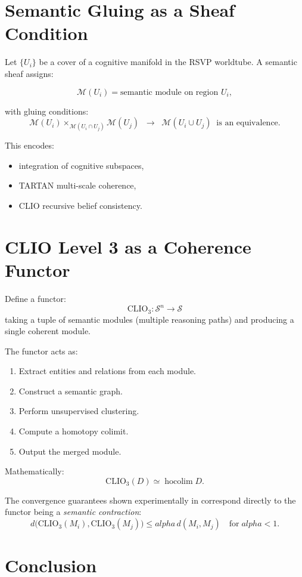 \documentclass[12pt,oneside]{book}
\theoremstyle{plain}
\theoremstyle{definition}
\def\alpha{alpha}%
\begin{document}
\section{Semantic Gluing as a Sheaf Condition}

Let $\{U_i\}$ be a cover of a cognitive manifold in the RSVP worldtube.  
A semantic sheaf assigns:

\[
\mathscr{M}(U_i) = \text{semantic module on region $U_i$},
\]

with gluing conditions:
\[
\mathscr{M}(U_i) \times_{\mathscr{M}(U_i \cap U_j)} \mathscr{M}(U_j)
\;\;\to\;\;
\mathscr{M}(U_i \cup U_j)
\;\;\text{is an equivalence}.
\]

This encodes:
\begin{itemize}
  \item integration of cognitive subspaces,
  \item TARTAN multi-scale coherence,
  \item CLIO recursive belief consistency.
\end{itemize}

\section{CLIO Level 3 as a Coherence Functor}

Define a functor:
\[
\mathrm{CLIO}_3 : \mathcal{S}^n \to \mathcal{S}
\]
taking a tuple of semantic modules (multiple reasoning paths) and producing a single coherent module.

The functor acts as:
\begin{enumerate}
  \item Extract entities and relations from each module.
  \item Construct a semantic graph.
  \item Perform unsupervised clustering.
  \item Compute a homotopy colimit.
  \item Output the merged module.
\end{enumerate}

Mathematically:
\[
\mathrm{CLIO}_3(D) \simeq \operatorname{hocolim} D.
\]

The convergence guarantees shown experimentally in  
\textcite{Cheng2025CognitiveLV}  
correspond directly to the functor being a \emph{semantic contraction}:
\[
d\bigl(\mathrm{CLIO}_3(M_i), \mathrm{CLIO}_3(M_j)\bigr)
\leq \alpha \, d(M_i, M_j)
\quad\text{for}\;\alpha < 1.
\]

\section{Conclusion}
\end{document}
